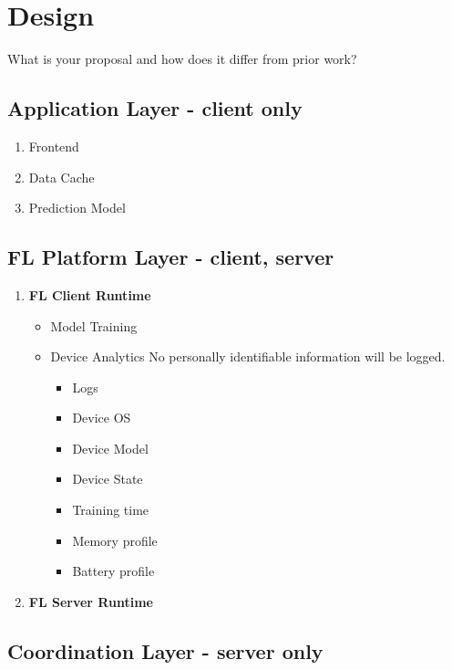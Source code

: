 \section{Design}
    What is your proposal and how does it differ from prior work?

    \subsection{Application Layer - client only}
        \begin{enumerate}
            \item Frontend
            \item Data Cache
            \item Prediction Model
        \end{enumerate}
    \subsection{FL Platform Layer - client, server}
        \begin{enumerate}
            \item \textbf{FL Client Runtime}
                \begin{itemize}
                    \item Model Training
                    \item Device Analytics \newline
                        No personally identifiable information will be logged.  
                        \begin{itemize}
                            \item Logs
                            \item Device OS
                            \item Device Model
                            \item Device State
                            \item Training time
                            \item Memory profile
                            \item Battery profile
                        \end{itemize}
                \end{itemize}
            \item \textbf{FL Server Runtime}

        \end{enumerate}
    \subsection{Coordination Layer - server only}
